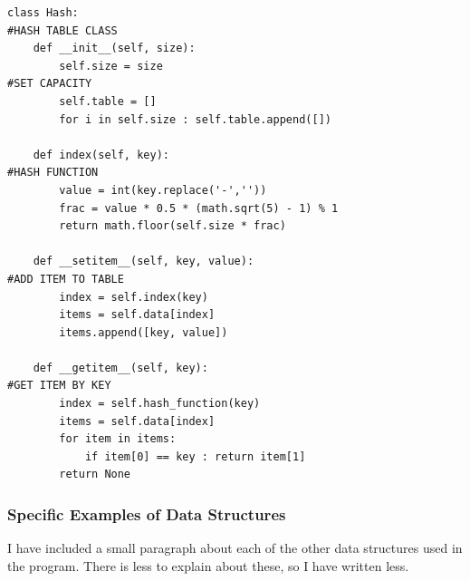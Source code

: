 \documentclass[titlepage]{article}
\begin{document}
\begin{changemargin}{-1in}{-1in} 
\begin{verbatim}
class Hash:                                                                     #HASH TABLE CLASS
    def __init__(self, size):
        self.size = size                                                        #SET CAPACITY
        self.table = []
        for i in self.size : self.table.append([])

    def index(self, key):                                                       #HASH FUNCTION
        value = int(key.replace('-',''))
        frac = value * 0.5 * (math.sqrt(5) - 1) % 1
        return math.floor(self.size * frac)
    
    def __setitem__(self, key, value):                                          #ADD ITEM TO TABLE
        index = self.index(key)
        items = self.data[index]
        items.append([key, value])

    def __getitem__(self, key):                                                 #GET ITEM BY KEY
        index = self.hash_function(key)
        items = self.data[index]
        for item in items:
            if item[0] == key : return item[1]
        return None
\end{verbatim}
\end{changemargin} 


\subsubsection{Specific Examples of Data Structures}
I have included a small paragraph about each of the other data structures used in the program. There is less to explain about these, so I have written less.
\end{document}
